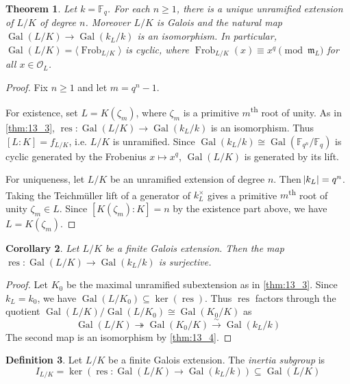 \documentclass[11pt]{article}
\theoremstyle{definition}
\newtheorem{definition}{Definition}[subsection]
\theoremstyle{plain}
\newtheorem{theorem}[definition]{Theorem}
\newtheorem{corollary}[definition]{Corollary}
\theoremstyle{remark}
\DeclareMathOperator{\Gal}{Gal}
\DeclareMathOperator{\res}{res}
\DeclareMathOperator{\Frob}{Frob}
\newcommand{\FF}{\mathbb{F}}
\newcommand{\cO}{\mathcal{O}}
\newcommand{\fm}{\mathfrak{m}}
\begin{document}
\begin{theorem}\label{thm:13_4}
    Let $k = \FF_q$. For each $n \ge 1$, there is a unique unramified extension of $L/K$ of degree $n$. Moreover $L/K$ is Galois and the natural map $\Gal(L/K) \to \Gal(k_L / k)$ is an isomorphism. In particular, $\Gal(L/K) = \langle \Frob_{L/K} \rangle$ is cyclic, where $\Frob_{L/K}(x) \equiv x^q \pmod{\fm_L}$ for all $x \in \cO_L$.
\end{theorem}
\begin{proof}
    Fix $n \ge 1$ and let $m = q^n - 1$.

    For existence, set $L = K(\zeta_m)$, where $\zeta_m$ is a primitive $m$\textsuperscript{th} root of unity. As in \autoref{thm:13_3}, $\res : \Gal(L/K) \to \Gal(k_L/k)$ is an isomorphism. Thus $[L : K] = f_{L/K}$, i.e. $L/K$ is unramified. Since $\Gal(k_L/k) \cong \Gal(\FF_{q^n}/\FF_q)$ is cyclic generated by the Frobenius $x \mapsto x^q$, $\Gal(L/K)$ is generated by its lift.

    For uniqueness, let $L/K$ be an unramified extension of degree $n$. Then $\abs{k_L} = q^n$. Taking the Teichm\"uller lift of a generator of $k_L^\times$ gives a primitive $m$\textsuperscript{th} root of unity $\zeta_m \in L$. Since $[K(\zeta_m) : K] = n$ by the existence part above, we have $L = K(\zeta_m)$.
\end{proof}

\begin{corollary}\label{cor:13_5}
    Let $L/K$ be a finite Galois extension. Then the map $\res : \Gal(L/K) \to \Gal(k_L / k)$ is surjective.
\end{corollary}
\begin{proof}
    Let $K_0$ be the maximal unramified subextension as in \autoref{thm:13_3}. Since $k_L = k_0$, we have $\Gal(L/K_0) \subseteq \ker(\res)$. Thus $\res$ factors through the quotient $\Gal(L/K) / \Gal(L / K_0) \cong \Gal(K_0 / K)$ as
    \begin{equation*}
        \Gal(L / K) \twoheadrightarrow \Gal(K_0 / K) \xrightarrow{\sim} \Gal(k_L / k)
    \end{equation*}
    The second map is an isomorphism by \autoref{thm:13_4}.
\end{proof}

\begin{definition}\label{def:13_6}
    Let $L/K$ be a finite Galois extension. The \emph{inertia subgroup} is
    \begin{equation*}
        I_{L/K} = \ker(\res : \Gal(L/K) \to \Gal(k_L / k)) \subseteq \Gal(L/K)
    \end{equation*}
\end{definition}
\end{document}
